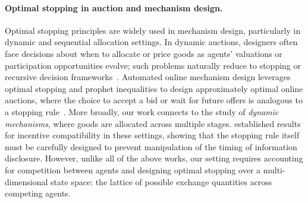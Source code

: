 \paragraph{Optimal stopping in auction and mechanism design.} 
Optimal stopping principles are widely used in  mechanism design, particularly in dynamic 
and sequential allocation settings. In dynamic auctions, designers often face decisions about when to allocate 
or price goods as agents' valuations or participation opportunities evolve; such problems naturally reduce 
to stopping or recursive decision frameworks~\citep{ashlagi2016sequential,samuel1984comparison,lucier2017economic}. 
Automated online mechanism design leverages optimal stopping and prophet inequalities to design approximately 
optimal online auctions, where the choice to accept a bid or wait for future offers is analogous to a stopping rule~\citep{hajiaghayi2007automated}. 
More broadly, our work connects to the study of \emph{dynamic mechanisms}, where goods are allocated across multiple stages. 
\citet{pavan2014dynamic} established results for incentive compatibility in these settings, showing that 
the stopping rule itself must be carefully designed to prevent manipulation of the timing of information disclosure. 
However, unlike all of the above works, our setting requires accounting for competition between agents and designing optimal stopping over a  multi-dimensional state space: 
the lattice of possible exchange quantities across competing agents.





